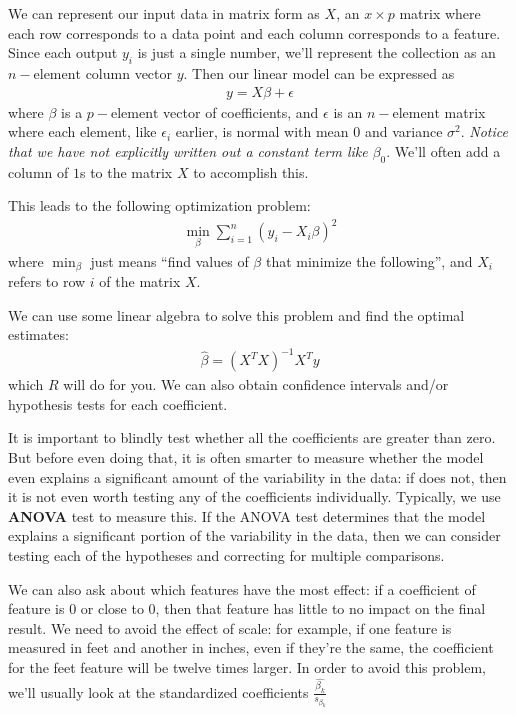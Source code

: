 \documentclass[a4paper]{article}
\numberwithin{equation}{section}
\begin{document}
We can represent our input data in matrix form as \(X\), an \(x \times p\) matrix where each row corresponds to a data point and each column corresponds to a feature. Since each output \(y_i\) is just a single number, we'll represent the collection as an \(n-\text{element}\) column vector \(y\).
Then our linear model can be expressed as
\begin{align*}
  y = X \beta + \epsilon
\end{align*}
where \(\beta \) is a \(p-\text{element}\) vector of coefficients, and \(\epsilon \) is an \(n-\text{element}\) matrix where each element, like \(\epsilon_i\) earlier, is normal with mean \(0\) and variance \(\sigma^2\).
\emph{Notice that we have not explicitly written out a constant term like \(\beta_0\)}. We'll often add a column of \(1\)s to the matrix \(X\) to accomplish this.

This leads to the following optimization problem:
\begin{align*}
  \min_{\beta} \sum_{i=1}^{n} {(y_i - X_i \beta)}^2
\end{align*}
where \(\min_{\beta}\) just means ``find values of \(\beta \) that minimize the following'', and \(X_i\) refers to row \(i\) of the matrix \(X\).

We can use some linear algebra to solve this problem and find the optimal estimates:
\begin{align*}
  \hat{\beta} = {(X^T X)}^{-1} X^T y
\end{align*}
which \(R\) will do for you. We can also obtain confidence intervals and/or hypothesis tests for each coefficient.

It is important to blindly test whether all the coefficients are greater than zero.
But before even doing that, it is often smarter to measure whether the model even explains a significant amount of the variability in the data: if does not, then it is not even worth testing any of the coefficients individually.
Typically, we use \textbf{ANOVA} test to measure this.
If the ANOVA test determines that the model explains a significant portion of the variability in the data, then we can consider testing each of the hypotheses and correcting for multiple comparisons.

We can also ask about which features have the most effect: if a coefficient of feature is \(0\) or close to \(0\), then that feature has little to no impact on the final result.
We need to avoid the effect of scale: for example, if one feature is measured in feet and another in inches, even if they're the same, the coefficient for the feet feature will be twelve times larger.
In order to avoid this problem, we'll usually look at the standardized coefficients \(\frac{\hat{\beta_k}}{s_{\beta_{k}}}\)
\end{document}
